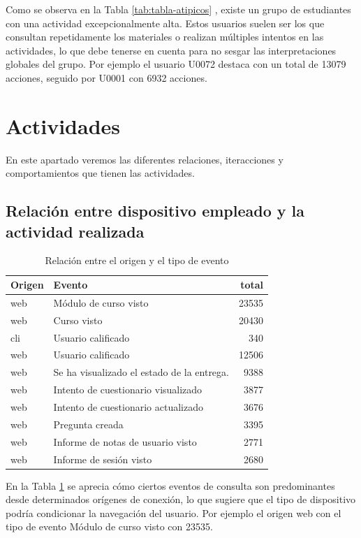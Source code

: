 \documentclass[notspecified,article,submit,moreauthors,pdftex]{Definitions/mdpi}
\begin{document}
Como se observa en la Tabla \ref{tab:tabla-atipicos} , existe un grupo
de estudiantes con una actividad excepcionalmente alta. Estos usuarios
suelen ser los que consultan repetidamente los materiales o realizan
múltiples intentos en las actividades, lo que debe tenerse en cuenta
para no sesgar las interpretaciones globales del grupo. Por ejemplo el
usuario U0072 destaca con un total de 13079 acciones, seguido por U0001
con 6932 acciones.

\section{Actividades}\label{actividades}

En este apartado veremos las diferentes relaciones, iteracciones y
comportamientos que tienen las actividades.

\subsection{Relación entre dispositivo empleado y la actividad
realizada}\label{relaciuxf3n-entre-dispositivo-empleado-y-la-actividad-realizada}

\begin{longtable}[t]{llr}
\caption{\label{tab:tabla-origen}Relación entre el origen y el tipo de evento}\\
\toprule
Origen & Evento & total\\
\midrule
web & Módulo de curso visto & 23535\\
web & Curso visto & 20430\\
cli & Usuario calificado & 340\\
web & Usuario calificado & 12506\\
web & Se ha visualizado el estado de la entrega. & 9388\\
\addlinespace
web & Intento de cuestionario visualizado & 3877\\
web & Intento de cuestionario actualizado & 3676\\
web & Pregunta creada & 3395\\
web & Informe de notas de usuario visto & 2771\\
web & Informe de sesión visto & 2680\\
\bottomrule
\end{longtable}

En la Tabla \ref{tab:tabla-origen} se aprecia cómo ciertos eventos de
consulta son predominantes desde determinados orígenes de conexión, lo
que sugiere que el tipo de dispositivo podría condicionar la navegación
del usuario. Por ejemplo el origen web con el tipo de evento Módulo de
curso visto con 23535.
\end{document}
